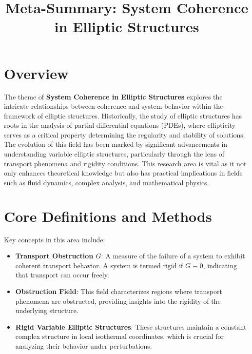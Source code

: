 \documentclass[11pt,a4paper]{article}
\title{Meta-Summary: System Coherence in Elliptic Structures}
\date{}
\begin{document}
\maketitle

\section{Overview}

The theme of \textbf{System Coherence in Elliptic Structures} explores the intricate relationships between coherence and system behavior within the framework of elliptic structures. Historically, the study of elliptic structures has roots in the analysis of partial differential equations (PDEs), where ellipticity serves as a critical property determining the regularity and stability of solutions. The evolution of this field has been marked by significant advancements in understanding variable elliptic structures, particularly through the lens of transport phenomena and rigidity conditions. This research area is vital as it not only enhances theoretical knowledge but also has practical implications in fields such as fluid dynamics, complex analysis, and mathematical physics.

\section{Core Definitions and Methods}

Key concepts in this area include:

\begin{itemize}
\item \textbf{Transport Obstruction \( G \)}: A measure of the failure of a system to exhibit coherent transport behavior. A system is termed rigid if \( G \equiv 0 \), indicating that transport can occur freely.
\end{itemize}

\begin{itemize}
\item \textbf{Obstruction Field}: This field characterizes regions where transport phenomena are obstructed, providing insights into the rigidity of the underlying structure.
\end{itemize}

\begin{itemize}
\item \textbf{Rigid Variable Elliptic Structures}: These structures maintain a constant complex structure in local isothermal coordinates, which is crucial for analyzing their behavior under perturbations.
\end{itemize}
\end{document}
